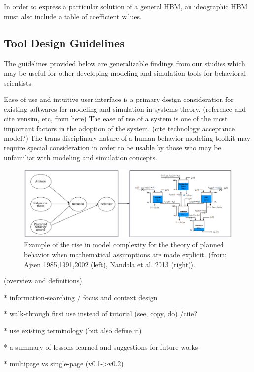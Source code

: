 \documentclass[conference]{IEEEtran}
\begin{document}
In order to express a particular solution of a general HBM, an ideographic HBM must also include a table of coefficient values. 

\subsection{Tool Design Guidelines}
The guidelines provided below are generalizable findings from our studies which may be useful for other developing modeling and simulation tools for behavioral scientists.


Ease of use and intuitive user interface is a primary design consideration for existing softwares for modeling and simulation in systems theory. (reference and cite vensim, etc, from here) 
The ease of use of a system is one of the most important factors in the adoption of the system. (cite technology acceptance model?) 
The trans-disciplinary nature of a human-behavior modeling toolkit may require special consideration in order to be usable by those who may be unfamiliar with modeling and simulation concepts.

\begin{figure}[!t]
  \centering
  \includegraphics[width=0.9\columnwidth]{img/path2flow}  
  \caption{Example of the rise in model complexity for the theory of planned behavior when mathematical assumptions are made explicit. (from: Ajzen 1985,1991,2002 (left), Nandola et al. 2013 (right)).}
  \label{path2flow}
\end{figure}


(overview and definitions)

* information-searching / focus and context design

* walk-through first use instead of tutorial (see, copy, do) /cite{?}

* use existing terminology (but also define it)

* a summary of lessons learned and suggestions for future works

* multipage vs single-page (v0.1->v0.2)
\end{document}
